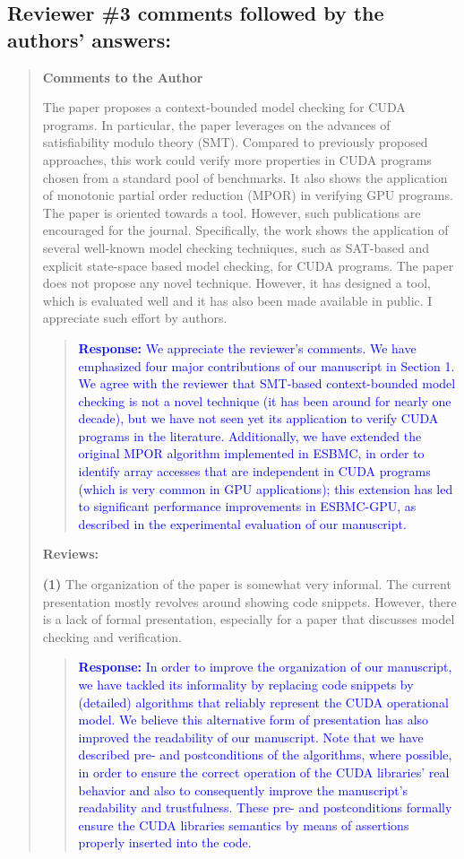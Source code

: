 \documentclass[11pt]{article}
\begin{document}
\subsection*{Reviewer \#3 comments followed by the authors' answers:}
\begin{quote}

{\bf Comments to the Author}

The paper proposes a context-bounded model checking for CUDA programs. In particular,
the paper leverages on the advances of satisfiability modulo theory (SMT). Compared
to previously proposed approaches, this work could verify more properties in CUDA
programs chosen from a standard pool of benchmarks. It also shows the application of
monotonic partial order reduction (MPOR) in verifying GPU programs. 
The paper is oriented towards a tool. However, such publications are encouraged for the journal. 
Specifically, the work shows the application of several well-known
model checking techniques, such as SAT-based and explicit state-space based model
checking, for CUDA programs. The paper does not propose any novel technique. However,
it has designed a tool, which is evaluated well and it has also been made available
in public. I appreciate such effort by authors.

\begin{quote}
\textcolor{blue}{\textbf{Response:} We appreciate the reviewer's comments. We have emphasized four major contributions of our manuscript in Section 1. We agree with the reviewer that SMT-based context-bounded model checking is not a novel technique (it has been around for nearly one decade), but we have not seen yet its application to verify CUDA programs in the literature. Additionally, we have extended the original MPOR algorithm implemented in ESBMC, in order to identify array accesses that are independent in CUDA programs (which is very common in GPU applications); this extension has led to significant performance improvements in ESBMC-GPU, as described in the experimental evaluation of our manuscript.}
\end{quote}

{\bf Reviews:}

{\bf(1)} The organization of the paper is somewhat very informal. The current presentation
mostly revolves around showing code snippets. However, there is a lack of formal
presentation, especially for a paper that discusses model checking and verification.

\begin{quote}
\textcolor{blue}{\textbf{Response:} In order to improve the organization of our manuscript, we have tackled its informality by replacing code snippets by (detailed) algorithms that reliably represent the CUDA operational model. We believe this alternative form of presentation has also improved the readability of our manuscript. Note that we have described pre- and postconditions of the algorithms, where possible, in order to ensure the correct operation of the CUDA libraries' real behavior and also to consequently improve the manuscript's readability and trustfulness. These pre- and postconditions formally ensure the CUDA libraries semantics by means of assertions properly inserted into the code.}
\end{quote}


\end{quote}
\end{document}
